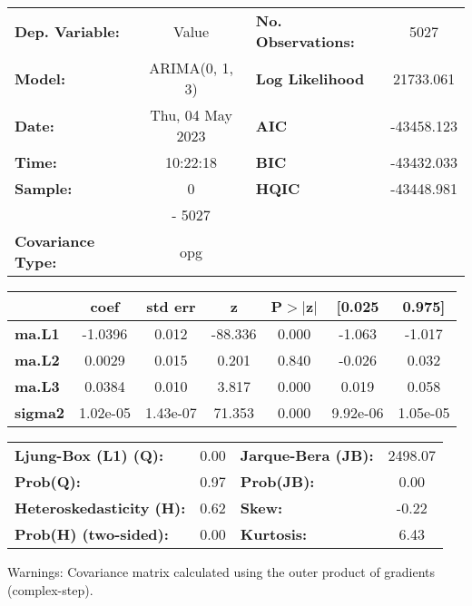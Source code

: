 \begin{center}
\begin{tabular}{lclc}
\toprule
\textbf{Dep. Variable:}          &      Value       & \textbf{  No. Observations:  } &    5027     \\
\textbf{Model:}                  &  ARIMA(0, 1, 3)  & \textbf{  Log Likelihood     } & 21733.061   \\
\textbf{Date:}                   & Thu, 04 May 2023 & \textbf{  AIC                } & -43458.123  \\
\textbf{Time:}                   &     10:22:18     & \textbf{  BIC                } & -43432.033  \\
\textbf{Sample:}                 &        0         & \textbf{  HQIC               } & -43448.981  \\
\textbf{}                        &      - 5027      & \textbf{                     } &             \\
\textbf{Covariance Type:}        &       opg        & \textbf{                     } &             \\
\bottomrule
\end{tabular}
\begin{tabular}{lcccccc}
                & \textbf{coef} & \textbf{std err} & \textbf{z} & \textbf{P$> |$z$|$} & \textbf{[0.025} & \textbf{0.975]}  \\
\midrule
\textbf{ma.L1}  &      -1.0396  &        0.012     &   -88.336  &         0.000        &       -1.063    &       -1.017     \\
\textbf{ma.L2}  &       0.0029  &        0.015     &     0.201  &         0.840        &       -0.026    &        0.032     \\
\textbf{ma.L3}  &       0.0384  &        0.010     &     3.817  &         0.000        &        0.019    &        0.058     \\
\textbf{sigma2} &     1.02e-05  &     1.43e-07     &    71.353  &         0.000        &     9.92e-06    &     1.05e-05     \\
\bottomrule
\end{tabular}
\begin{tabular}{lclc}
\textbf{Ljung-Box (L1) (Q):}     & 0.00 & \textbf{  Jarque-Bera (JB):  } & 2498.07  \\
\textbf{Prob(Q):}                & 0.97 & \textbf{  Prob(JB):          } &   0.00   \\
\textbf{Heteroskedasticity (H):} & 0.62 & \textbf{  Skew:              } &  -0.22   \\
\textbf{Prob(H) (two-sided):}    & 0.00 & \textbf{  Kurtosis:          } &   6.43   \\
\bottomrule
\end{tabular}
\end{center}

Warnings: \newline
 [1] Covariance matrix calculated using the outer product of gradients (complex-step).